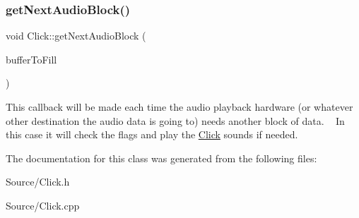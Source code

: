 \subsubsection{\texorpdfstring{getNextAudioBlock()}{getNextAudioBlock()}}
{\footnotesize\ttfamily void Click\+::get\+Next\+Audio\+Block (\begin{DoxyParamCaption}\item[{const Audio\+Source\+Channel\+Info \&}]{buffer\+To\+Fill }\end{DoxyParamCaption})\hspace{0.3cm}{\ttfamily [override]}}

This callback will be made each time the audio playback hardware (or whatever other destination the audio data is going to) needs another block of data. ~\newline
 In this case it will check the flags and play the \mbox{\hyperlink{class_click}{Click}} sounds if needed. 

The documentation for this class was generated from the following files\+:\begin{DoxyCompactItemize}
\item 
Source/Click.\+h\item 
Source/Click.\+cpp\end{DoxyCompactItemize}

